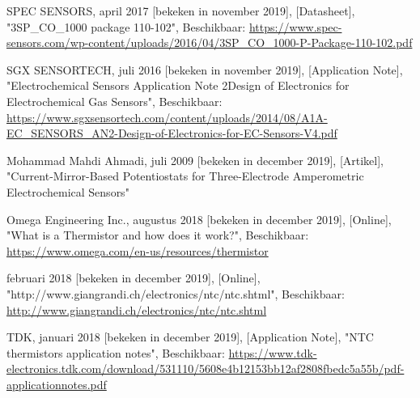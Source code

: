 \documentclass[a4paper, 11pt]{article} %
\begin{document}
	\begin{thebibliography}{9}
		SPEC SENSORS,
		april 2017 [bekeken in november 2019],
		[Datasheet],
		"3SP\_CO\_1000 package 110-102",
		Beschikbaar:
		\url{https://www.spec-sensors.com/wp-content/uploads/2016/04/3SP_CO_1000-P-Package-110-102.pdf}
		
		SGX SENSORTECH,
		juli 2016 [bekeken in november 2019],
		[Application Note],
		"Electrochemical Sensors Application Note 2Design of Electronics for Electrochemical Gas Sensors",
		Beschikbaar:
		\url{https://www.sgxsensortech.com/content/uploads/2014/08/A1A-EC_SENSORS_AN2-Design-of-Electronics-for-EC-Sensors-V4.pdf}
		
		Mohammad Mahdi Ahmadi,
		juli 2009 [bekeken in december 2019],
		[Artikel],
		"Current-Mirror-Based Potentiostats for Three-Electrode Amperometric Electrochemical Sensors"
		
		Omega Engineering Inc.,
		augustus 2018 [bekeken in december 2019],
		[Online],
		"What is a Thermistor and how does it work?",
		Beschikbaar:
		\url{https://www.omega.com/en-us/resources/thermistor}	
			
		februari 2018 [bekeken in december 2019],
		[Online],
		"http://www.giangrandi.ch/electronics/ntc/ntc.shtml",
		Beschikbaar:
		\url{http://www.giangrandi.ch/electronics/ntc/ntc.shtml}	
			
		TDK,
		januari 2018 [bekeken in december 2019],
		[Application Note],
		"NTC thermistors application notes",
		Beschikbaar:
		\url{https://www.tdk-electronics.tdk.com/download/531110/5608e4b12153bb12af2808fbedc5a55b/pdf-applicationnotes.pdf}

	\end{thebibliography}
\end{document}
